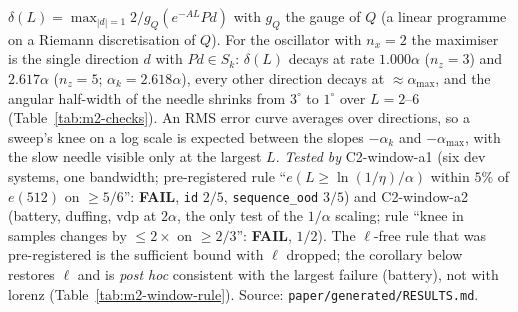 $\delta(L)=\max_{|d|=1}2/g_Q(e^{-AL}Pd)$ with $g_Q$ the gauge of $Q$ (a linear programme on a Riemann discretisation
of $Q$). For the oscillator with $n_x=2$ the maximiser is the single direction $d$ with $Pd\in S_k$: $\delta(L)$
decays at rate $1.000\alpha$ ($n_z=3$) and $2.617\alpha$ ($n_z=5$; $\alpha_k=2.618\alpha$), every other direction
decays at $\approx\alpha_{\max}$, and the angular half-width of the needle shrinks from $3^\circ$ to $1^\circ$ over
$L=2$--$6$ (Table~\ref{tab:m2-checks}). An RMS error curve averages over directions, so a sweep's knee on a log scale
is expected between the slopes $-\alpha_k$ and $-\alpha_{\max}$, with the slow needle visible only at the largest $L$.
\emph{Tested by} C2-window-a1 (six dev systems, one bandwidth; pre-registered rule ``$e(L\ge\ln(1/\eta)/\alpha)$ within
$5\%$ of $e(512)$ on $\ge5/6$'': \textbf{FAIL}, \texttt{id} $2/5$, \texttt{sequence\_ood} $3/5$) and C2-window-a2 (battery,
duffing, vdp at $2\alpha$, the only test of the $1/\alpha$ scaling; rule ``knee in samples changes by $\le2\times$ on
$\ge2/3$'': \textbf{FAIL}, $1/2$). The $\ell$-free rule that was pre-registered is the sufficient bound with $\ell$ dropped;
the corollary below restores $\ell$ and is \emph{post hoc} consistent with the largest failure (battery), not with lorenz
(Table~\ref{tab:m2-window-rule}). Source:
\texttt{paper/generated/RESULTS.md}.

